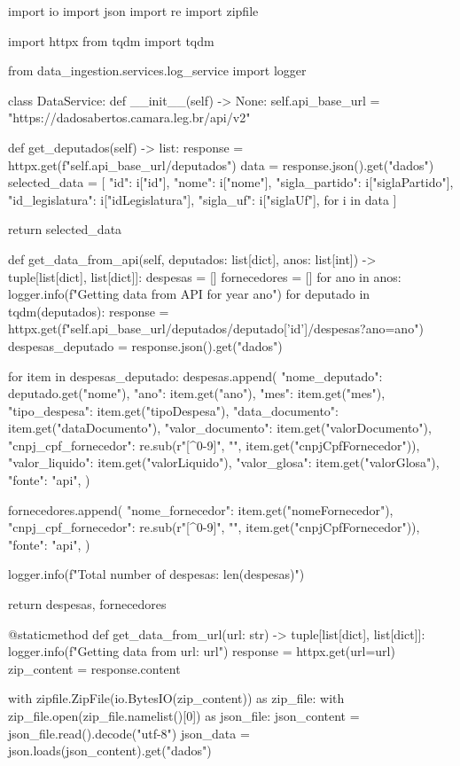 \documentclass[12pt, a4paper]{article}
\begin{document}
\begin{python}
import io
import json
import re
import zipfile

import httpx
from tqdm import tqdm

from data_ingestion.services.log_service import logger


class DataService:
	def __init__(self) -> None:
		self.api_base_url = "https://dadosabertos.camara.leg.br/api/v2"

	def get_deputados(self) -> list:
		response = httpx.get(f"{self.api_base_url}/deputados")
		data = response.json().get("dados")
		selected_data = [
			{
				"id": i["id"],
				"nome": i["nome"],
				"sigla_partido": i["siglaPartido"],
				"id_legislatura": i["idLegislatura"],
				"sigla_uf": i["siglaUf"],
			}
			for i in data
		]
		
		return selected_data

	def get_data_from_api(self, deputados: list[dict], anos: list[int]) -> tuple[list[dict], list[dict]]:
		despesas = []
		fornecedores = []
		for ano in anos:
			logger.info(f"Getting data from API for year {ano}")
			for deputado in tqdm(deputados):
				response = httpx.get(f"{self.api_base_url}/deputados/{deputado['id']}/despesas?ano={ano}")
				despesas_deputado = response.json().get("dados")
		
				for item in despesas_deputado:
					despesas.append({
						"nome_deputado": deputado.get("nome"),
						"ano": item.get("ano"),
						"mes": item.get("mes"),
						"tipo_despesa": item.get("tipoDespesa"),
						"data_documento": item.get("dataDocumento"),
						"valor_documento": item.get("valorDocumento"),
						"cnpj_cpf_fornecedor": re.sub(r"[^0-9]", "", item.get("cnpjCpfFornecedor")),
						"valor_liquido": item.get("valorLiquido"),
						"valor_glosa": item.get("valorGlosa"),
						"fonte": "api",
					})
				
					fornecedores.append({
						"nome_fornecedor": item.get("nomeFornecedor"),
						"cnpj_cpf_fornecedor": re.sub(r"[^0-9]", "", item.get("cnpjCpfFornecedor")),
						"fonte": "api",
					})
		
		logger.info(f"Total number of despesas: {len(despesas)}")
		
		return despesas, fornecedores

	@staticmethod
	def get_data_from_url(url: str) -> tuple[list[dict], list[dict]]:
		logger.info(f"Getting data from url: {url}")
		response = httpx.get(url=url)
		zip_content = response.content
	
		with zipfile.ZipFile(io.BytesIO(zip_content)) as zip_file:
			with zip_file.open(zip_file.namelist()[0]) as json_file:
				json_content = json_file.read().decode("utf-8")
				json_data = json.loads(json_content).get("dados")
	

\end{python}
\end{document}
